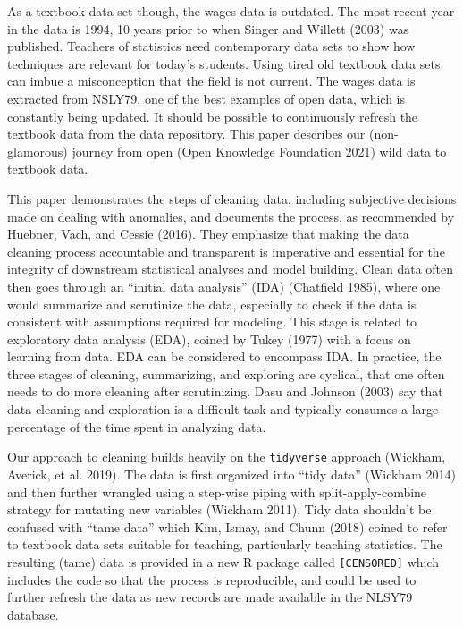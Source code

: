 \documentclass{article}
\begin{document}
As a textbook data set though, the wages data is outdated. The most recent year in the data is 1994, 10 years prior to when Singer and Willett (2003) was published. Teachers of statistics need contemporary data sets to show how techniques are relevant for today's students. Using tired old textbook data sets can imbue a misconception that the field is not current. The wages data is extracted from NSLY79, one of the best examples of open data, which is constantly being updated. It should be possible to continuously refresh the textbook data from the data repository. This paper describes our (non-glamorous) journey from open (Open Knowledge Foundation 2021) wild data to textbook data.

This paper demonstrates the steps of cleaning data, including subjective decisions made on dealing with anomalies, and documents the process, as recommended by Huebner, Vach, and Cessie (2016). They emphasize that making the data cleaning process accountable and transparent is imperative and essential for the integrity of downstream statistical analyses and model building. Clean data often then goes through an ``initial data analysis'' (IDA) (Chatfield 1985), where one would summarize and scrutinize the data, especially to check if the data is consistent with assumptions required for modeling. This stage is related to exploratory data analysis (EDA), coined by Tukey (1977) with a focus on learning from data. EDA can be considered to encompass IDA. In practice, the three stages of cleaning, summarizing, and exploring are cyclical, that one often needs to do more cleaning after scrutinizing. Dasu and Johnson (2003) say that data cleaning and exploration is a difficult task and typically consumes a large percentage of the time spent in analyzing data.

Our approach to cleaning builds heavily on the \texttt{tidyverse} approach (Wickham, Averick, et al. 2019). The data is first organized into ``tidy data'' (Wickham 2014) and then further wrangled using a step-wise piping with split-apply-combine strategy for mutating new variables (Wickham 2011). Tidy data shouldn't be confused with ``tame data'' which Kim, Ismay, and Chunn (2018) coined to refer to textbook data sets suitable for teaching, particularly teaching statistics. The resulting (tame) data is provided in a new R package called \texttt{[CENSORED]} which includes the code so that the process is reproducible, and could be used to further refresh the data as new records are made available in the NLSY79 database.
\end{document}
